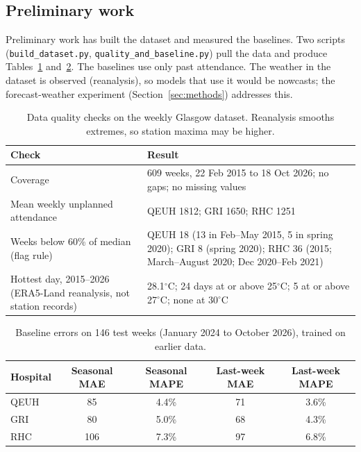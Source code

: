 \documentclass[12pt]{article}
\begin{document}
\subsection{Preliminary work}\label{sec:prelim}
Preliminary work has built the dataset and measured the baselines. Two scripts (\texttt{build\_dataset.py}, \texttt{quality\_and\_baseline.py}) pull the data and produce Tables~\ref{table:quality} and~\ref{table:baselines}. The baselines use only past attendance. The weather in the dataset is observed (reanalysis), so models that use it would be nowcasts; the forecast-weather experiment (Section~\ref{sec:methods}) addresses this.

\begin{table}[h!]
\centering
\small
\begin{tabular}{|p{4.6cm}|p{9.2cm}|}
 \hline
 Check & Result \\
 \hline
 Coverage & 609 weeks, 22 Feb 2015 to 18 Oct 2026; no gaps; no missing values \\
 Mean weekly unplanned attendance & QEUH 1812; GRI 1650; RHC 1251 \\
 Weeks below 60\% of median (flag rule) & QEUH 18 (13 in Feb--May 2015, 5 in spring 2020); GRI 8 (spring 2020); RHC 36 (2015; March--August 2020; Dec 2020--Feb 2021) \\
 Hottest day, 2015--2026 (ERA5-Land reanalysis, not station records) & 28.1$^\circ$C; 24 days at or above 25$^\circ$C; 5 at or above 27$^\circ$C; none at 30$^\circ$C \\
 \hline
\end{tabular}
\caption{Data quality checks on the weekly Glasgow dataset. Reanalysis smooths extremes, so station maxima may be higher.}
\label{table:quality}
\end{table}

\begin{table}[h!]
\centering
\small
\begin{tabular}{|l|c|c|c|c|}
 \hline
 Hospital & Seasonal MAE & Seasonal MAPE & Last-week MAE & Last-week MAPE \\
 \hline
 QEUH & 85 & 4.4\% & 71 & 3.6\% \\
 GRI & 80 & 5.0\% & 68 & 4.3\% \\
 RHC & 106 & 7.3\% & 97 & 6.8\% \\
 \hline
\end{tabular}
\caption{Baseline errors on 146 test weeks (January 2024 to October 2026), trained on earlier data.}
\label{table:baselines}
\end{table}
\end{document}
